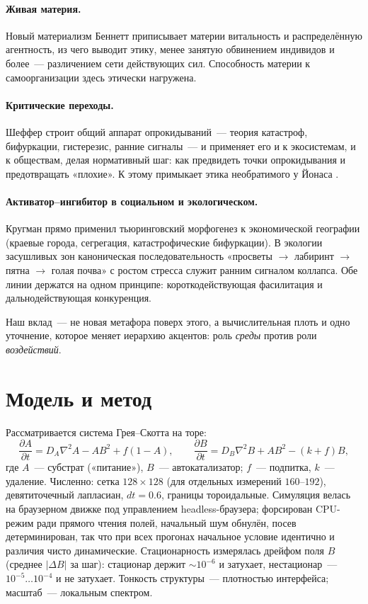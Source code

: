 \documentclass[11pt]{article}
\newcommand{\DA}{D_{\!A}}\newcommand{\DB}{D_{\!B}}
\begin{document}
\paragraph{Живая материя.} Новый материализм Беннетт \cite{bennett2010} приписывает материи витальность и
распределённую агентность, из чего выводит этику, менее занятую обвинением индивидов и более~— различением сети
действующих сил. Способность материи к самоорганизации здесь этически нагружена.

\paragraph{Критические переходы.} Шеффер \cite{scheffer2009} строит общий аппарат опрокидываний~— теория
катастроф, бифуркации, гистерезис, ранние сигналы~— и применяет его и к экосистемам, и к обществам, делая
нормативный шаг: как предвидеть точки опрокидывания и предотвращать «плохие». К этому примыкает этика
необратимого у Йонаса \cite{jonas1979}.

\paragraph{Активатор–ингибитор в социальном и экологическом.} Кругман \cite{krugman1996} прямо применил
тьюринговский морфогенез к экономической географии (краевые города, сегрегация, катастрофические бифуркации).
В экологии засушливых зон \cite{rietkerk2004,meron2015} каноническая последовательность «просветы $\to$ лабиринт
$\to$ пятна $\to$ голая почва» с ростом стресса служит ранним сигналом коллапса. Обе линии держатся на одном
принципе: короткодействующая фасилитация и дальнодействующая конкуренция.

Наш вклад~— не новая метафора поверх этого, а вычислительная плоть и одно уточнение, которое меняет иерархию
акцентов: роль \emph{среды} против роли \emph{воздействий}.

\section{Модель и метод}
Рассматривается система Грея–Скотта на торе:
\begin{equation}
\frac{\partial A}{\partial t}=\DA\nabla^2 A-AB^2+f(1-A),\qquad
\frac{\partial B}{\partial t}=\DB\nabla^2 B+AB^2-(k+f)B ,
\label{eq:gs}
\end{equation}
где $A$~— субстрат («питание»), $B$~— автокатализатор; $f$~— подпитка, $k$~— удаление. Численно: сетка
$128\times128$ (для отдельных измерений $160$–$192$), девятиточечный лапласиан, $dt=0.6$, границы тороидальные.
Симуляция велась на браузерном движке под управлением headless-браузера; форсирован CPU-режим ради прямого
чтения полей, начальный шум обнулён, посев детерминирован, так что при всех прогонах начальное условие
идентично и различия чисто динамические. Стационарность измерялась дрейфом поля $B$ (среднее $|\Delta B|$ за шаг):
стационар держит ${\sim}10^{-6}$ и затухает, нестационар~— $10^{-5}\!\ldots\!10^{-4}$ и не затухает. Тонкость
структуры~— плотностью интерфейса; масштаб~— локальным спектром.
\end{document}
